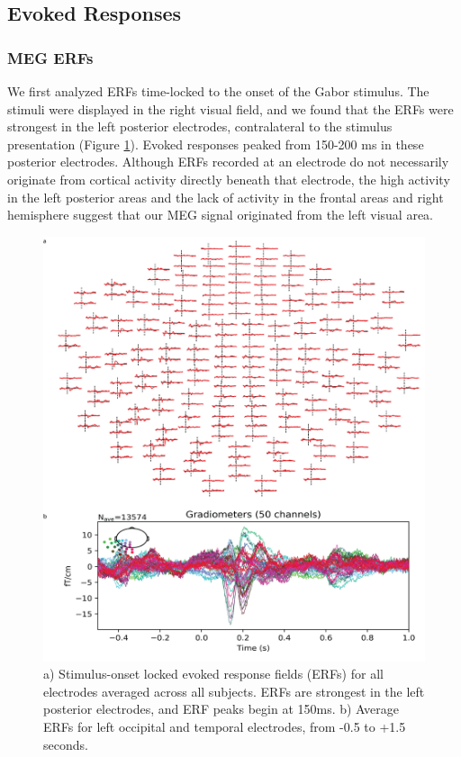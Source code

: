 \documentclass[../main.tex]{subfiles}
\begin{document}
\subsection*{Evoked Responses}
\subsubsection*{MEG ERFs}
We first analyzed ERFs time-locked to the onset of the Gabor stimulus. The stimuli were displayed in the right visual field, and we found that the ERFs were strongest in the left posterior electrodes, contralateral to the stimulus presentation (Figure \ref{erfs}). Evoked responses peaked from 150-200 ms in these posterior electrodes. Although ERFs recorded at an electrode do not necessarily originate from cortical activity directly beneath that electrode, the high activity in the left posterior areas and the lack of activity in the frontal areas and right hemisphere suggest that our MEG signal originated from the left visual area.

\begin{figure}
    \centering
    \includegraphics[scale=0.7]{figures/results/erf_results.png}
    \caption{a) Stimulus-onset locked evoked response fields (ERFs) for all electrodes averaged across all subjects. ERFs are strongest in the left posterior electrodes, and ERF peaks begin at 150ms. b) Average ERFs for left occipital and temporal electrodes, from -0.5 to +1.5 seconds.}
    \label{erfs}
\end{figure}
\end{document}
